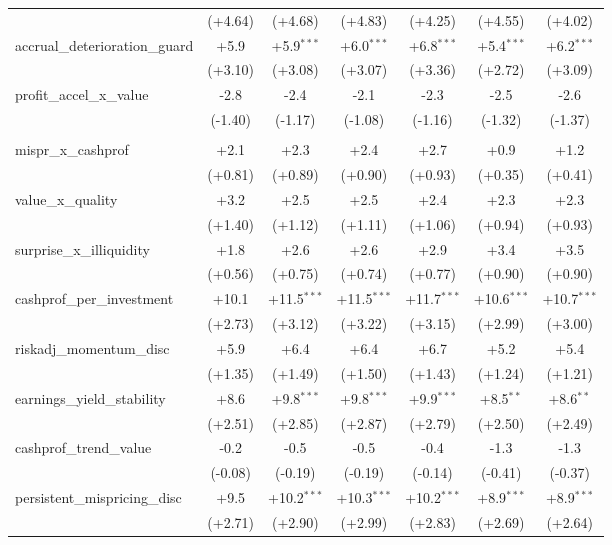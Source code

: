 \begin{table}[htbp]
\begin{threeparttable}
\begin{tabular}{lcccccc}
 & (+4.64) & (+4.68) & (+4.83) & (+4.25) & (+4.55) & (+4.02) \\
\addlinespace
accrual\_deterioration\_guard & +5.9 & +5.9$^{***}$ & +6.0$^{***}$ & +6.8$^{***}$ & +5.4$^{***}$ & +6.2$^{***}$ \\
 & (+3.10) & (+3.08) & (+3.07) & (+3.36) & (+2.72) & (+3.09) \\
\addlinespace
profit\_accel\_x\_value & -2.8 & -2.4 & -2.1 & -2.3 & -2.5 & -2.6 \\
 & (-1.40) & (-1.17) & (-1.08) & (-1.16) & (-1.32) & (-1.37) \\
\addlinespace
\midrule
\multicolumn{7}{l}{\textit{Panel B: Out-of-sample (post-2000-12-31)}} \\
\addlinespace
mispr\_x\_cashprof & +2.1 & +2.3 & +2.4 & +2.7 & +0.9 & +1.2 \\
 & (+0.81) & (+0.89) & (+0.90) & (+0.93) & (+0.35) & (+0.41) \\
\addlinespace
value\_x\_quality & +3.2 & +2.5 & +2.5 & +2.4 & +2.3 & +2.3 \\
 & (+1.40) & (+1.12) & (+1.11) & (+1.06) & (+0.94) & (+0.93) \\
\addlinespace
surprise\_x\_illiquidity & +1.8 & +2.6 & +2.6 & +2.9 & +3.4 & +3.5 \\
 & (+0.56) & (+0.75) & (+0.74) & (+0.77) & (+0.90) & (+0.90) \\
\addlinespace
cashprof\_per\_investment & +10.1 & +11.5$^{***}$ & +11.5$^{***}$ & +11.7$^{***}$ & +10.6$^{***}$ & +10.7$^{***}$ \\
 & (+2.73) & (+3.12) & (+3.22) & (+3.15) & (+2.99) & (+3.00) \\
\addlinespace
riskadj\_momentum\_disc & +5.9 & +6.4 & +6.4 & +6.7 & +5.2 & +5.4 \\
 & (+1.35) & (+1.49) & (+1.50) & (+1.43) & (+1.24) & (+1.21) \\
\addlinespace
earnings\_yield\_stability & +8.6 & +9.8$^{***}$ & +9.8$^{***}$ & +9.9$^{***}$ & +8.5$^{**}$ & +8.6$^{**}$ \\
 & (+2.51) & (+2.85) & (+2.87) & (+2.79) & (+2.50) & (+2.49) \\
\addlinespace
cashprof\_trend\_value & -0.2 & -0.5 & -0.5 & -0.4 & -1.3 & -1.3 \\
 & (-0.08) & (-0.19) & (-0.19) & (-0.14) & (-0.41) & (-0.37) \\
\addlinespace
persistent\_mispricing\_disc & +9.5 & +10.2$^{***}$ & +10.3$^{***}$ & +10.2$^{***}$ & +8.9$^{***}$ & +8.9$^{***}$ \\
 & (+2.71) & (+2.90) & (+2.99) & (+2.83) & (+2.69) & (+2.64) \\

\end{tabular}
\end{threeparttable}
\end{table}
